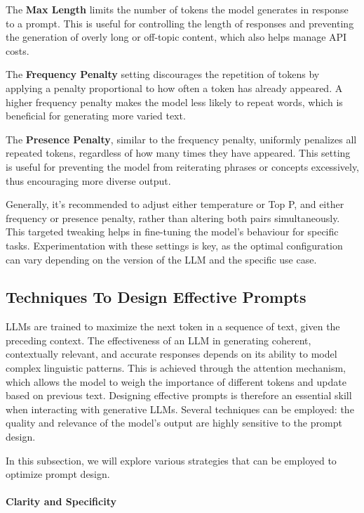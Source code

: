 The \textbf{Max Length} limits the number of tokens the model generates in response to a prompt. This is useful for controlling the length of responses and preventing the generation of overly long or off-topic content, which also helps manage API costs.

The \textbf{Frequency Penalty} setting discourages the repetition of tokens by applying a penalty proportional to how often a token has already appeared. A higher frequency penalty makes the model less likely to repeat words, which is beneficial for generating more varied text.

The \textbf{Presence Penalty}, similar to the frequency penalty, uniformly penalizes all repeated tokens, regardless of how many times they have appeared. This setting is useful for preventing the model from reiterating phrases or concepts excessively, thus encouraging more diverse output.

Generally, it's recommended to adjust either temperature or Top P, and either frequency or presence penalty, rather than altering both pairs simultaneously. This targeted tweaking helps in fine-tuning the model's behaviour for specific tasks.
Experimentation with these settings is key, as the optimal configuration can vary depending on the version of the LLM and the specific use case.

\subsection{Techniques To Design Effective Prompts}
\label{sec:prompts}
LLMs are trained to maximize the next token in a sequence of text, given the preceding context. The effectiveness of an LLM in generating coherent, contextually relevant, and accurate responses depends on its ability to model complex linguistic patterns. This is achieved through the attention mechanism, which allows the model to weigh the importance of different tokens and update based on previous text. Designing effective prompts is therefore an essential skill when interacting with generative LLMs. Several techniques can be employed: the quality and relevance of the model's output are highly sensitive to the prompt design.

In this subsection, we will explore various strategies that can be employed to optimize prompt design.

\paragraph{Clarity and Specificity}

